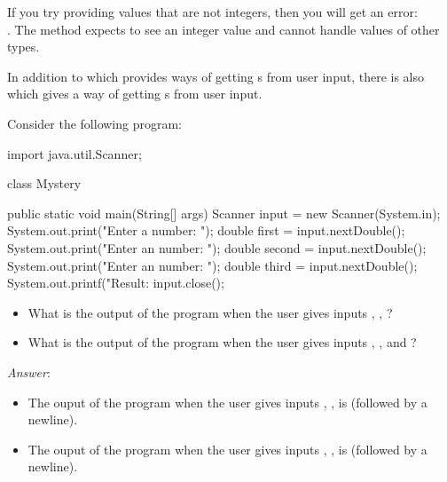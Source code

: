 If you try providing values that are not integers,
then you will get an error:\\.
The method  expects to see an integer value
and cannot handle values of other types.

In addition to  which provides ways of
getting s from user input, there is
also  which gives a way of getting
s from user input.

\begin{example}
Consider the following program:
\begin{code}
import java.util.Scanner;

class Mystery {

  public static void main(String[] args) {
    Scanner input = new Scanner(System.in);
    System.out.print("Enter a number: ");
    double first = input.nextDouble();
    System.out.print("Enter an number: ");
    double second = input.nextDouble();
    System.out.print("Enter an number: ");
    double third = input.nextDouble();
    System.out.printf("Result:%
    input.close();
  }

}
\end{code}
\begin{itemize}
\item
What is the output of the program when the user gives inputs , , ?
\item
What is the output of the program when the user gives inputs , , and ?
\end{itemize}
\noindent \emph{Answer}:
\begin{itemize}
\item
The ouput of the program when the user gives inputs , , 
is  (followed by a newline).
\item
The ouput of the program when the user gives inputs , , 
is  (followed by a newline).
\end{itemize}
\end{example}
